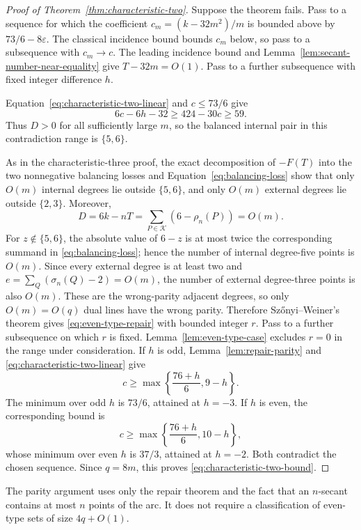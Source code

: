 \begin{proof}[Proof of Theorem~\ref{thm:characteristic-two}]
Suppose the theorem fails.  Pass to a sequence for which the coefficient
\(c_m=(k-32m^2)/m\) is bounded above by
\(73/6-8\varepsilon\).  The classical incidence bound bounds \(c_m\) below,
so pass to a subsequence with \(c_m\to c\).  The leading incidence bound and
Lemma~\ref{lem:secant-number-near-equality} give
\(T-32m=O(1)\).  Pass to a further subsequence with fixed integer difference
\(h\).

Equation~\eqref{eq:characteristic-two-linear} and \(c\le73/6\) give
\[
 6c-6h-32\ge424-30c\ge59.
\]
Thus \(D>0\) for all sufficiently large \(m\), so the balanced internal pair
in this contradiction range is \(\{5,6\}\).

As in the characteristic-three proof, the exact decomposition of \(-F(T)\)
into the two nonnegative balancing losses and
Equation~\eqref{eq:balancing-loss} show that only \(O(m)\) internal degrees
lie outside \(\{5,6\}\), and only \(O(m)\) external degrees lie outside
\(\{2,3\}\).  Moreover,
\[
 D=6k-nT=\sum_{P\in\mathcal K}(6-\rho_n(P))=O(m).
\]
For \(z\notin\{5,6\}\), the absolute value of \(6-z\) is at most twice the
corresponding summand in \eqref{eq:balancing-loss}; hence the number of
internal degree-five points is \(O(m)\).  Since every external degree is at
least two and
\(e=\sum_Q(\sigma_n(Q)-2)=O(m)\), the number of external degree-three points
is also \(O(m)\).  These are the wrong-parity adjacent degrees, so only
\(O(m)=O(q)\) dual lines have the wrong parity.  Therefore
Sz\H{o}nyi--Weiner's theorem gives \eqref{eq:even-type-repair} with bounded
integer \(r\).  Pass to a further subsequence on which \(r\) is fixed.
Lemma~\ref{lem:even-type-case} excludes \(r=0\) in the range under
consideration.  If \(h\) is odd, Lemma~\ref{lem:repair-parity} and
\eqref{eq:characteristic-two-linear} give
\[
 c\ge\max\left\{\frac{76+h}{6},9-h\right\}.
\]
The minimum over odd \(h\) is \(73/6\), attained at \(h=-3\).  If \(h\) is
even, the corresponding bound is
\[
 c\ge\max\left\{\frac{76+h}{6},10-h\right\},
\]
whose minimum over even \(h\) is \(37/3\), attained at \(h=-2\).  Both
contradict the chosen sequence.  Since \(q=8m\), this proves
\eqref{eq:characteristic-two-bound}.
\end{proof}

The parity argument uses only the repair theorem and the fact that an
\(n\)-secant contains at most \(n\) points of the arc.  It does not require a
classification of even-type sets of size \(4q+O(1)\).
